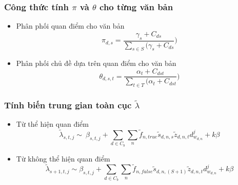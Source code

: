 \documentclass{beamer}
\begin{document}

\begin{frame}[shrink=25]
\frametitle{Công thức tính $\pi$ và $\theta$ cho từng văn bản}
\begin{itemize}
\item Phân phối quan điểm cho văn bản
\begin{equation}
\label{equal:pi}
\pi_{d,s} = \frac{\gamma_s + C_{ds}}{\sum_{s \in S}(\gamma_s+C_{ds}})
\end{equation}
\item Phân phối chủ đề dựa trên quan điểm cho văn bản
\begin{equation}
\label{equal:theta}
\theta_{d,s,t} = \frac{\alpha_t + C_{dst}}{\sum_{t \in T}(\alpha_t+C_{dst}})
\end{equation}
\end{itemize}
\end{frame}


\begin{frame}[shrink=25]
\frametitle{Tính biến trung gian toàn cục $\tilde{\lambda}$}
\begin{itemize}
\item Từ thể hiện quan điểm
\begin{equation}
\label{equal:lambda_S}
\tilde{\lambda}_{s,t,j} \sim \ \beta_{s,t,j} + \sum_{d \in C_b} \sum_n \tilde{f}_{n,true}\tilde{s}_{d,n,s}\tilde{z}_{d,n,t}d_{w_{d,n}}^j + k\beta 
\end{equation}
\item Từ không thể hiện quan điểm
\begin{equation}
\label{equal:lambda_S+1}
 \tilde{\lambda}_{s+1,t,j} \sim \beta_{s,t,j} + \sum_{d \in C_b} \sum_n \tilde{f}_{n,false}\tilde{s}_{d,n,(S+1)}\tilde{z}_{d,n,t}d_{w_{d,n}}^j + k\beta 
\end{equation}
\end{itemize}
\end{frame}

\end{document}
